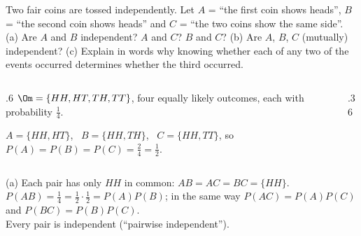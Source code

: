 
\begin{problem}
	Two fair coins are tossed independently. Let $A$ = ``the first coin shows heads'', $B$ =
	``the second coin shows heads'' and $C$ = ``the two coins show the same
	side''. (a) Are $A$ and $B$ independent? $A$ and $C$? $B$ and $C$? (b) Are
	$A$, $B$, $C$ (mutually) independent? (c) Explain in words why knowing whether
	each of any two of the events occurred determines whether the third
	occurred.
\end{problem}

\begin{slides}
	\small
	\exstatement
	\pause
	\begin{columns}[T]
		\begin{column}{.6\textwidth}
			\sol $\Om=\{HH,HT,TH,TT\}$, four equally likely outcomes,
			each with probability $\frac14$.
			\pause

			\smallskip
			$A=\{HH,HT\}$, \ $B=\{HH,TH\}$, \ $C=\{HH,TT\}$, so
			$P(A)=P(B)=P(C)=\frac24=\frac12$.
		\end{column}
		\begin{column}{.36\textwidth}
			\uncover<3->{
				\centering
				\begin{tabular}{c|ccc}
					     & $A$ & $B$ & $C$ \\ \hline
					$HH$ & $\bullet$ & $\bullet$ & $\bullet$ \\
					$HT$ & $\bullet$ &            &            \\
					$TH$ &            & $\bullet$ &            \\
					$TT$ &            &            & $\bullet$
				\end{tabular}
			}
		\end{column}
	\end{columns}
	\pause
	\smallskip
	(a) Each pair has only $HH$ in common:
	$AB=AC=BC=\{HH\}$.
	\pause\\[1mm]
	$P(AB)=\frac14=\frac12\cdot\frac12=P(A)P(B)$; in the same way
	$P(AC)=P(A)P(C)$ and $P(BC)=P(B)P(C)$.
	\pause\\[1mm]
	\alert{Every pair is independent} (``pairwise independent'').
\end{slides}

